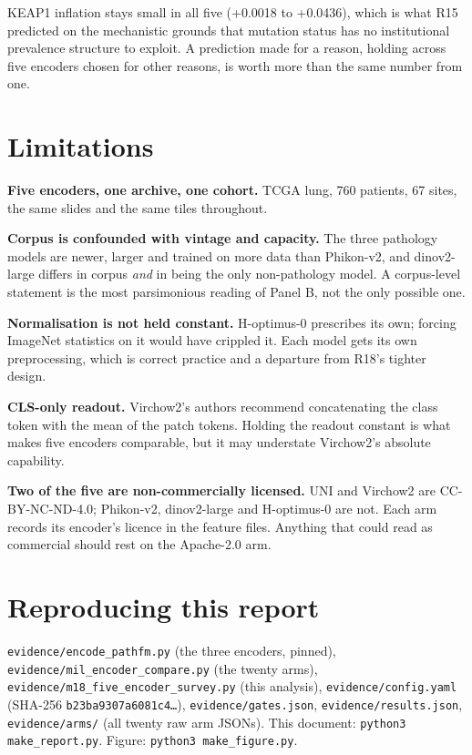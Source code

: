\documentclass[11pt,a4paper]{article}
\begin{document}
KEAP1 inflation stays small in all five (+0.0018 to
+0.0436), which is what R15 predicted on the mechanistic
grounds that mutation status has no institutional prevalence structure to exploit. A prediction made
for a reason, holding across five encoders chosen for other reasons, is worth more than the same
number from one.

\section{Limitations}

\textbf{Five encoders, one archive, one cohort.} TCGA lung, 760 patients, 67 sites, the same
slides and the same tiles throughout.

\textbf{Corpus is confounded with vintage and capacity.} The three pathology models are newer,
larger and trained on more data than Phikon-v2, and dinov2-large differs in corpus \emph{and} in
being the only non-pathology model. A corpus-level statement is the most parsimonious reading of
Panel B, not the only possible one.

\textbf{Normalisation is not held constant.} H-optimus-0 prescribes its own; forcing ImageNet
statistics on it would have crippled it. Each model gets its own preprocessing, which is correct
practice and a departure from R18's tighter design.

\textbf{CLS-only readout.} Virchow2's authors recommend concatenating the class token with the
mean of the patch tokens. Holding the readout constant is what makes five encoders comparable, but
it may understate Virchow2's absolute capability.

\textbf{Two of the five are non-commercially licensed.} UNI and Virchow2 are CC-BY-NC-ND-4.0;
Phikon-v2, dinov2-large and H-optimus-0 are not. Each arm records its encoder's licence in the
feature files. Anything that could read as commercial should rest on the Apache-2.0 arm.

\section*{Reproducing this report}

\texttt{evidence/encode\_pathfm.py} (the three encoders, pinned),
\texttt{evidence/mil\_encoder\_compare.py} (the twenty arms),
\texttt{evidence/m18\_five\_encoder\_survey.py} (this analysis),
\texttt{evidence/config.yaml} (SHA-256 \texttt{b23ba9307a6081c4\ldots}),
\texttt{evidence/gates.json}, \texttt{evidence/results.json},
\texttt{evidence/arms/} (all twenty raw arm JSONs).
This document: \texttt{python3 make\_report.py}. Figure: \texttt{python3 make\_figure.py}.
\end{document}
